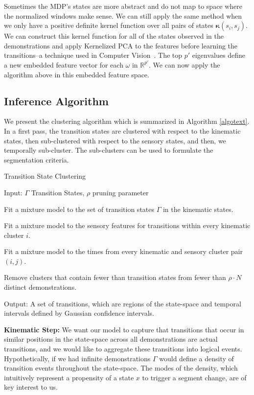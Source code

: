 Sometimes the MDP's states are more abstract and do not map to space where the normalized windows make sense.
We can still apply the same method when we only have a positive definite kernel function over all pairs of states $\mathbf{\kappa}(s_i,s_j)$.
We can construct this kernel function for all of the states observed in the demonstrations and apply Kernelized PCA to the features before learning the transitions--a technique used in Computer Vision~\cite{DBLP:conf/nips/MikaSSMSR98}.
The top $p'$ eigenvalues define a new embedded feature vector for each $\omega$ in $\mathbb{R}^{p'}$.
We can now apply the algorithm above in this embedded feature space.


\subsection{Inference Algorithm}
We present the clustering algorithm which is summarized in Algorithm \ref{algotext}.
In a first pass, the transition states are clustered with respect to the kinematic states, then sub-clustered with respect to the sensory states, and then, we temporally sub-cluster.
The sub-clusters can be used to formulate the segmentation criteria.

\begin{algorithm}[t]
\caption{Transition State Clustering \label{algotext}}
\begin{algorithmic}[1]
\State \textsf{Input: } $\Gamma$ Transition States, $\rho$ pruning parameter

\State Fit a mixture model to the set of transition states $\Gamma$ in the kinematic states.

\State Fit a mixture model to the sensory features for transitions within every kinematic cluster $i$.

\State Fit a mixture model to the times from every kinematic and sensory cluster pair $(i,j)$.

\State Remove clusters that contain fewer than transition states from fewer than $\rho \cdot N$ distinct demonstrations.

\State \textsf{Output: } A set of transitions, which are regions of the state-space and temporal intervals defined by Gaussian confidence intervals.

\end{algorithmic}

\end{algorithm}

\vspace{0.5em}\noindent\textbf{Kinematic Step: } We want our model to capture that transitions that occur in similar positions in the state-space across all demonstrations are actual transitions, and we would like to aggregate these transitions into logical events. 
Hypothetically, if we had infinite demonstrations $\Gamma$ would define a density of transition events throughout the state-space.
The modes of the density, which intuitively represent a propensity of a state $x$ to trigger a segment change, are of key interest to us. 


